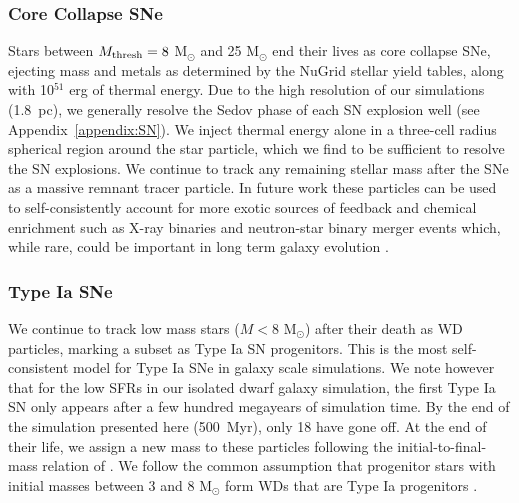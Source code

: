 \documentclass[twocolumn]{aastex61}
\begin{document}
\subsubsection{Core Collapse SNe}
\label{sec: core collapse}
Stars between  $M_{\rm thresh} = 8$ M$_{\odot}$ and 25 M$_{\odot}$ end their lives as core collapse SNe, ejecting mass and metals as determined by the NuGrid stellar yield tables, along with 10$^{51}$ erg of thermal energy. Due to the high resolution of our simulations (1.8~pc), we generally resolve the Sedov phase of each SN explosion well (see Appendix~\ref{appendix:SN}). We inject thermal energy alone in a three-cell radius spherical region around the star particle, which we find to be sufficient to resolve the SN explosions. We continue to track any remaining stellar mass after the SNe as a massive remnant tracer particle. In future work these particles can be used to self-consistently account for more exotic sources of feedback and chemical enrichment such as X-ray binaries and neutron-star binary merger events which, while rare, could be important in long term galaxy evolution \citep[e.g.][]{Artale2015}.

\subsubsection{Type Ia SNe}
\label{sec:Type Ia}
We continue to track low mass stars ($M < 8$ M$_{\odot}$) after their death as WD particles, marking a subset as Type Ia SN progenitors. This is the most self-consistent model for Type Ia SNe in galaxy scale simulations. We note however that for the low SFRs in our isolated dwarf galaxy simulation, the first Type Ia SN only appears after a few hundred megayears of simulation time. By the end of the simulation presented here (500~Myr), only 18 have gone off. At the end of their life, we assign a new mass to these particles following the initial-to-final-mass relation of \citet{Salaris2009}.
We follow the common assumption that progenitor stars with initial masses between 3 and 8 M$_{\odot}$ form WDs that are Type Ia progenitors \citep[see][ and references therein]{Cote2017}. 
\end{document}
